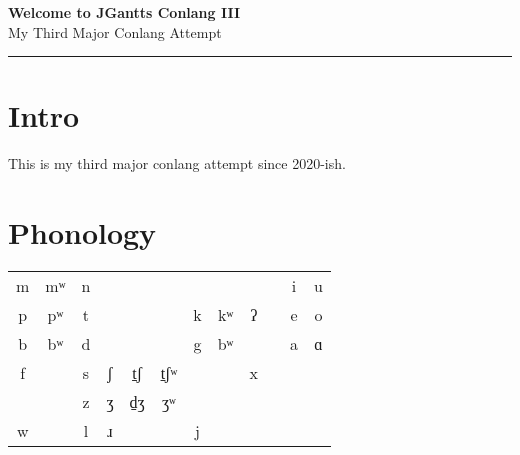 \documentclass[12pt]{article}
\newcommand{\customtitle}[1]{
    \begin{center}
        \vspace*{2cm}
        {\Huge\bfseries\color{primary} #1}\\
        \vspace{0.5cm}
        {\Large My Third Major Conlang Attempt}\\
        \vspace{1cm}
    \end{center}
    \vspace{1cm}
    \hrule
    \vspace{1cm}
}
\begin{document}
\pagecolor{background}

\customtitle{Welcome to JGantts Conlang III}

\section{Intro}
This is my third major conlang attempt since 2020-ish.

\section{Phonology}
\begin{table}[H]
\begin{tabular}{clclllllllll}
m                    & \multicolumn{1}{c}{mʷ} & n &                       &                         &                          &                       &                        &                       &  & \multicolumn{1}{c}{i} & \multicolumn{1}{c}{u} \\
p                    & \multicolumn{1}{c}{pʷ} & t &                       &                         &                          & \multicolumn{1}{c}{k} & \multicolumn{1}{c}{kʷ} & \multicolumn{1}{c}{ʔ} &  & \multicolumn{1}{c}{e} & \multicolumn{1}{c}{o} \\
b                    & \multicolumn{1}{c}{bʷ} & d &                       &                         &                          & \multicolumn{1}{c}{g} & \multicolumn{1}{c}{bʷ} &                       &  & \multicolumn{1}{c}{a} & \multicolumn{1}{c}{ɑ} \\
f                    &                        & s & \multicolumn{1}{c}{ʃ} & \multicolumn{1}{c}{t̠ʃ} & \multicolumn{1}{c}{t̠ʃʷ} &                       &                        & \multicolumn{1}{c}{x} &  &                       &                       \\
\multicolumn{1}{l}{} &                        & z & \multicolumn{1}{c}{ʒ} & \multicolumn{1}{c}{d̠ʒ} & \multicolumn{1}{c}{ʒʷ}   &                       &                        &                       &  &                       &                       \\
w                    &                        & l & \multicolumn{1}{c}{ɹ} &                         &                          & \multicolumn{1}{c}{j} &                        &                       &  &                       &                      
\end{tabular}
\end{table}
\end{document}

